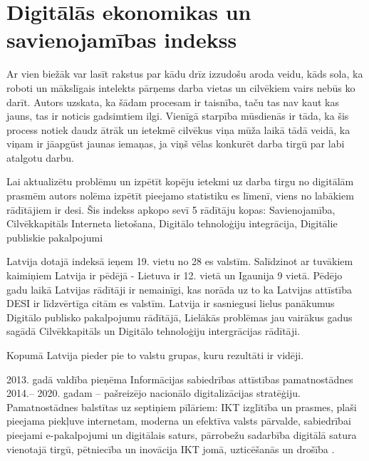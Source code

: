 \section{Digitālās ekonomikas un savienojamības indekss}
Ar vien biežāk var lasīt rakstus par kādu drīz izzudošu aroda veidu, kāds sola, ka roboti un 
mākslīgais intelekts pārņems darba vietas un cilvēkiem vairs nebūs ko darīt. Autors uzskata,
ka šādam procesam ir taisnība, taču tas nav kaut kas jauns, tas ir noticis gadsimtiem ilgi.
Vienīgā starpība mūsdienās ir tāda, ka šis process notiek daudz ātrāk un ietekmē cilvēkus viņa
mūža laikā tādā veidā, ka viņam ir jāapgūst jaunas iemaņas, ja viņš vēlas konkurēt darba tirgū
par labi atalgotu darbu.
\par
Lai aktualizētu problēmu un izpētīt kopēju ietekmi uz darba tirgu no digitālām prasmēm 
autors nolēma izpētīt pieejamo statistiku \gls{es} līmenī, viens no labākiem
rādītājiem ir \gls{desi}. Šis indekss apkopo sevī 5 rādītāju kopas: Savienojamība, Cilvēkkapitāls
Interneta lietošana, Digitālo tehnoloģiju integrācija, Digitālie publiskie pakalpojumi
\par
Latvija dotajā indeksā ieņem 19. vietu no 28 \acrshort{es} valstīm. Salīdzinot
ar tuvākiem kaimiņiem Latvija ir pēdējā - Lietuva ir 12. vietā un Igaunija 9 vietā. Pēdējo
gadu laikā Latvijas rādītāji ir nemainīgi, kas norāda uz to ka Latvijas attīstība DESI
ir līdzvērtīga citām \acrshort{es} valstīm. Latvija ir sasniegusi lielus panākumus 
Digitālo publisko pakalpojumu rādītājā, Lielākās problēmas jau vairākus gadus sagādā
Cilvēkkapitāls un Digitālo tehnoloģiju intergrācijas rādītāji.
\par
Kopumā Latvija pieder pie to valstu grupas, kuru rezultāti ir vidēji.
\par
2013. gadā valdība pieņēma Informācijas sabiedrības attīstības pamatnostādnes 2014.–
2020. gadam – pašreizējo nacionālo digitalizācijas stratēģiju. Pamatnostādnes balstītas uz
septiņiem pīlāriem: IKT izglītība un prasmes, plaši pieejama piekļuve internetam, moderna
un efektīva valsts pārvalde, sabiedrībai pieejami e-pakalpojumi un digitālais saturs,
pārrobežu sadarbība digitālā satura vienotajā tirgū, pētniecība un inovācija IKT jomā,
uzticēšanās un drošība \cite{desi_Latvija} \cite{soc_dev}.
